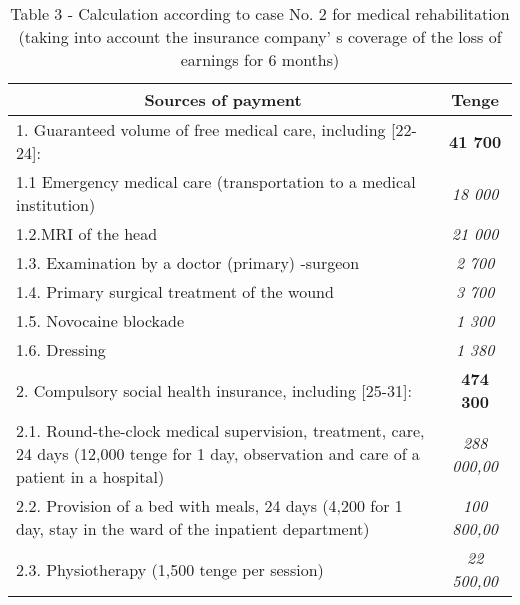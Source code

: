 \begin{table}[H]
\caption*{Table 3 - Calculation according to case No. 2 for medical
rehabilitation (taking into account the insurance
company' s coverage of the loss of earnings for 6 months)}
\centering
\begin{tabular}{|p{}|c|}
\hline
\multicolumn{1}{|c|}{\textbf{Sources of payment}}                                                                        & \textbf{Tenge}      \\ \hline
1. Guaranteed volume of free medical care, including {[}22-24{]}:                                                        & \textbf{41 700}     \\ \hline
1.1 Emergency medical care (transportation to a medical institution)                                                     & \textit{18 000}     \\ \hline
1.2.MRI of the head                                                                                                      & \textit{21 000}     \\ \hline
1.3. Examination by a doctor (primary) -surgeon                                                                          & \textit{2 700}      \\ \hline
1.4. Primary surgical treatment of the wound                                                                             & \textit{3 700}      \\ \hline
1.5. Novocaine blockade                                                                                                  & \textit{1 300}      \\ \hline
1.6. Dressing                                                                                                            & \textit{1 380}      \\ \hline
2. Compulsory social health insurance, including {[}25-31{]}:                                                            & \textbf{474 300}    \\ \hline
2.1. Round-the-clock medical supervision, treatment, care, 24 days (12,000 tenge for 1 day, observation and care of a patient in a hospital) & \textit{288 000,00} \\ \hline
2.2. Provision of a bed with meals, 24 days (4,200 for 1 day, stay in the ward of the inpatient department)              & \textit{100 800,00} \\ \hline
2.3. Physiotherapy (1,500 tenge per session)                                                                             & \textit{22 500,00}  \\ \hline

\end{tabular}
\end{table}
